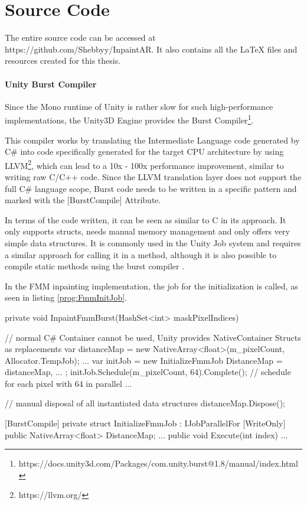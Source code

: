 \chapter{Source Code}
\label{app:SourceCode}

The entire source code can be accessed at https://github.com/Shebbyy/InpaintAR. It also contains all the LaTeX files and resources created for this thesis.

\subsubsection{Unity Burst Compiler}
Since the Mono runtime of Unity is rather slow for such high-performance implementations, the Unity3D Engine provides the Burst Compiler\footnote{https://docs.unity3d.com/Packages/com.unity.burst@1.8/manual/index.html}.

This compiler works by translating the Intermediate Language code generated by C\string# into code specifically generated for the target CPU architecture by using LLVM\footnote{https://llvm.org/}, which can lead to a 10x - 100x performance improvement, similar to writing raw C/C++ code.
Since the LLVM translation layer does not support the full C\string# language scope, Burst code needs to be written in a specific pattern and marked with the [BurstCompile] Attribute.

In terms of the code written, it can be seen as similar to C in its approach. It only supports structs, needs manual memory management and only offers very simple data structures. It is commonly used in the Unity Job system and
requires a similar approach for calling it in a method, although it is also possible to compile static methods using the burst compiler \cite{SchönerBurst}.

In the FMM inpainting implementation, the job for the initialization is called, as seen in listing \ref{prog:FmmInitJob}.

\begin{listing}[h!]
\caption{Fast Marching Method Initialization Job call structure}
\label{prog:FmmInitJob}
\begin{CsCodeCust}
private void InpaintFmmBurst(HashSet<int> maskPixelIndices) {
    // normal C# Container cannot be used, Unity provides NativeContainer Structs as replacements
    var distanceMap = new NativeArray<float>(m_pixelCount, Allocator.TempJob);
    ...
    var initJob = new InitializeFmmJob {
        DistanceMap = distanceMap,
        ...
    };
    initJob.Schedule(m_pixelCount, 64).Complete(); // schedule for each pixel with 64 in parallel
    ...

    // manual disposal of all instantiated data structures
    distanceMap.Dispose();
}

[BurstCompile]
private struct InitializeFmmJob : IJobParallelFor {
    [WriteOnly] public NativeArray<float> DistanceMap;
    ...
    public void Execute(int index) {
        ...
    }
}
\end{CsCodeCust}
\end{listing}
